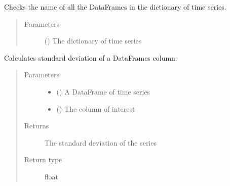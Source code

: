 \documentclass[letterpaper,10pt,english]{sphinxmanual}
\begin{document}
\begin{fulllineitems}
\label{\detokenize{index:Forecaster.eval_inspect.check_length}}
Checks the name of all the DataFrames in the dictionary of time series.
\begin{quote}\begin{description}
\item[{Parameters}] \leavevmode
{} () \textendash{} The dictionary of time series

\end{description}\end{quote}

\end{fulllineitems}


\begin{fulllineitems}
\label{\detokenize{index:Forecaster.eval_inspect.df_std}}
Calculates standard deviation of a DataFrames column.
\begin{quote}\begin{description}
\item[{Parameters}] \leavevmode\begin{itemize}
\item {} 
 () \textendash{} A DataFrame of time series

\item {} 
 () \textendash{} The column of interest

\end{itemize}

\item[{Returns}] \leavevmode
The standard deviation of the series

\item[{Return type}] \leavevmode
float

\end{description}\end{quote}

\end{fulllineitems}
\end{document}
